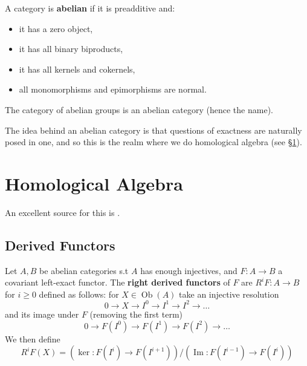 \documentclass{article}
\begin{document}
\begin{definition}
	A category is \textbf{abelian} if it is preadditive and: 
	\begin{itemize}
		\item it has a zero object, 
		\item it has all binary biproducts,
		\item it has all kernels and cokernels,
		\item all monomorphisms and epimorphisms are normal. 
	\end{itemize}
\end{definition}

\begin{example}
	The category of abelian groups is an abelian category (hence the name). 
\end{example}

\begin{remark}
	The idea behind an abelian category is that questions of exactness are naturally posed in one, and so this is the realm where we do homological algebra (see \S \ref{sec: homological algebra}).
\end{remark}
\section{Homological Algebra}\label{sec: homological algebra}
An excellent source for this is \cite{Weibel1995}. 

\subsection{Derived Functors}

\begin{definition}
	Let $A,B$ be abelian categories s.t $A$ has enough injectives, and $F :A \to B$ a covariant left-exact functor. The \textbf{right derived functors} of $F$ are $R^iF:A \to B$ for $i \geq 0$ defined as follows: for $X \in \operatorname{Ob}(A)$ take an injective resolution
	\[
	0 \to X \to I^0 \to I^1 \to I^2 \to \dots
	\]
	and its image under $F$ (removing the first term)
	\[
	0 \to F(I^0) \to F(I^1) \to F(I^2) \to \dots 
	\]
We then define 
\[
R^iF(X) = (\ker :F(I^i) \to F(I^{i+1}))/(\operatorname{Im}:F(I^{i-1}) \to F(I^i))
\]
\end{definition}
\end{document}
